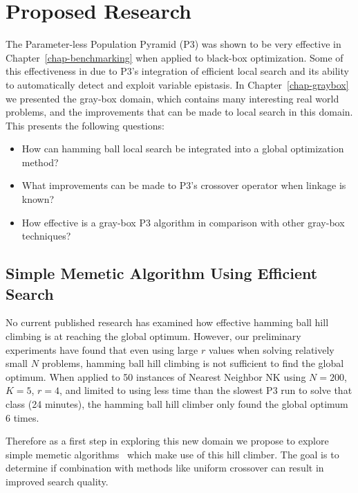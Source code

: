 \chapter{Proposed Research}
The Parameter-less Population Pyramid (P3) was shown to be very effective in Chapter~\ref{chap-benchmarking}
when applied to black-box optimization. Some of this effectiveness in due to P3's integration of
efficient local search and its ability to automatically detect and exploit variable epistasis.
In Chapter~\ref{chap-graybox} we presented the gray-box domain, which contains many interesting
real world problems, and the improvements that can be made to local search in this domain.
This presents the following questions:

\begin{itemize}
\item How can hamming ball local search be integrated into a global optimization method?
\item What improvements can be made to P3's crossover operator when linkage is known?
\item How effective is a gray-box P3 algorithm in comparison with other gray-box techniques?
\end{itemize}

\section{Simple Memetic Algorithm Using Efficient Search}
No current published research has examined how effective hamming ball hill climbing is at reaching the global
optimum. However, our preliminary experiments have found that even using large $r$ values when solving relatively small $N$
problems, hamming ball hill climbing is not sufficient to find the global optimum. When applied to 50 instances
of Nearest Neighbor NK using $N=200$, $K=5$, $r=4$, and limited to using less time than the slowest P3 run to solve that class (24 minutes),
the hamming ball hill climber only found the global optimum 6 times.

Therefore as a first step in exploring this new domain we propose to explore simple memetic algorithms~\cite{chen:2011:memetic}
which make use of this hill climber. The goal is to determine if combination with methods like uniform crossover
can result in improved search quality.

